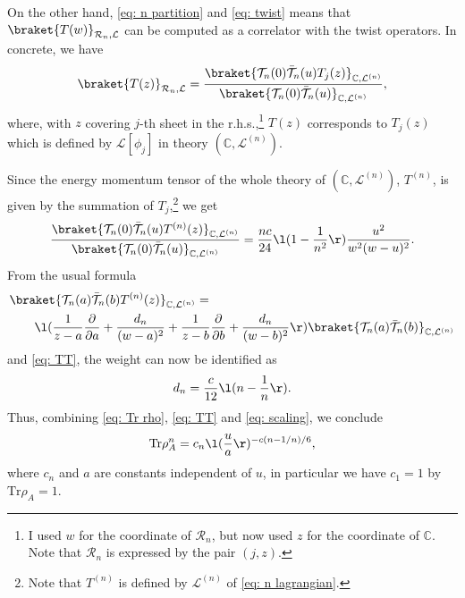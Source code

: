 \documentclass[12pt]{article}
\begin{document}
On the other hand, \eqref{eq: n partition} and \eqref{eq: twist} means that $\braket{T(w)}_{\mathcal R_n,\mathcal L}$ can be computed as a correlator with the twist operators.
In concrete, we have 
\begin{align}
	\braket{T(z)}_{\mathcal R_n,\mathcal L} 
	= \frac{\braket{\mathcal T_n(0)\bar{\mathcal T}_n(u)T_j(z)}_{\mathbb C,\mathcal L^{(n)}}}
	{\braket{\mathcal T_n(0)\bar{\mathcal T}_n(u)}_{\mathbb C,\mathcal L^{(n)}}},
\end{align}
where, with $z$ covering $j$-th sheet in the r.h.s.,\footnote{
I used $w$ for the coordinate of $\mathcal R_n$, but now used $z$ for the coordinate of $\mathbb C$.
Note that $\mathcal R_n$ is expressed by the pair $(j,z)$.
}
$T(z)$ corresponds to $T_j(z)$ which is defined by $\mathcal L[\phi_j]$ in theory $(\mathbb C,\mathcal L^{(n)})$.

Since the energy momentum tensor of the whole theory of $(\mathbb C,\mathcal L^{(n)})$, $T^{(n)}$, is given by the summation of $T_j$,\footnote{
Note that $T^{(n)}$ is defined by $\mathcal L^{(n)}$ of \eqref{eq: n lagrangian}.
}
we get
\begin{align}
	\frac{\braket{\mathcal T_n(0)\bar{\mathcal T}_n(u)T^{(n)}(z)}_{\mathbb C,\mathcal L^{(n)}}}
	{\braket{\mathcal T_n(0)\bar{\mathcal T}_n(u)}_{\mathbb C,\mathcal L^{(n)}}}
	=
	\frac{nc}{24}\l(1-\frac{1}{n^2}\r)\frac{u^2}{w^2(w-u)^2}.
\end{align}
From the usual formula%
\begin{align}
	&\braket{\mathcal T_n(a)\bar{\mathcal T}_n(b)T^{(n)}(z)}_{\mathbb C,\mathcal L^{(n)}}=\nonumber\\
	&\qquad
	\l(\frac{1}{z-a}\frac{\partial}{\partial a} + \frac{d_n}{(w-a)^2}
	+\frac{1}{z-b}\frac{\partial}{\partial b} + \frac{d_n}{(w-b)^2} \r)
	\braket{\mathcal T_n(a)\bar{\mathcal T}_n(b)}_{\mathbb C,\mathcal L^{(n)}}
\end{align}
and \eqref{eq: TT}, the weight can now be identified as
\begin{align}
	d_n = \frac{c}{12}\l(n-\frac{1}{n}\r).\label{eq: scaling}
\end{align}
Thus, combining \eqref{eq: Tr rho}, \eqref{eq: TT} and \eqref{eq: scaling}, we conclude
\begin{align}
	\mathrm{Tr}\rho_A^n = c_n\l(\frac{u}{a}\r)^{-c(n-1/n)/6},
\end{align}
where $c_n$ and $a$ are constants independent of $u$, in particular we have $c_1=1$ by $\mathrm{Tr}\rho_A = 1$.
\end{document}
